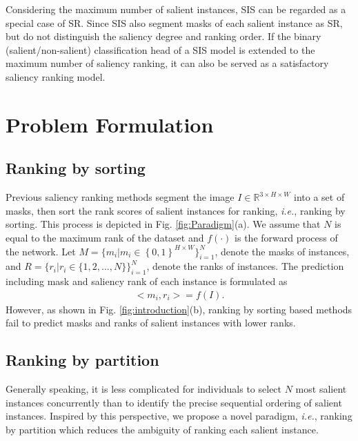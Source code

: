 \documentclass[sigconf]{acmart}
\def\ie{{\em i.e.}}
\begin{document}
Considering the maximum number of salient instances, SIS can be regarded as a special case of SR. Since SIS also segment masks of each salient instance as SR, but do not distinguish the saliency degree and ranking order. If the binary (salient/non-salient) classification head of a SIS model is extended to the maximum number of saliency ranking, it can also be served as a satisfactory saliency ranking model.

\section{Problem Formulation}
\subsection{Ranking by sorting} 
Previous saliency ranking methods \cite{siris2020inferring, liu2021instance, fang2021salient, tian2022bi} segment the image $I\in\mathbb{R}^{3\times H\times W}$ into a set of masks, then sort the rank scores of salient instances for ranking, \ie{}, ranking by sorting. This process is depicted in Fig. \ref{fig:Paradigm}(a). We assume that $N$ is equal to the maximum rank of the dataset and $f(\cdot)$ is the forward process of the network. Let $M = \{m_{i}|m_{i}\in\left\{0,1\right\}^{H\times W}\}_{i=1}^N$, denote the masks of instances, and $R = \{r_{i}|r_{i} \in \{1, 2, ..., N\}\}_{i=1}^N$, denote the ranks of instances. The prediction including mask and saliency rank of each instance is formulated as
 \begin{equation}
 \begin{split}
<m_i, r_\textit{i}> = f(I).
 \end{split}
 \end{equation}
However, as shown in Fig. \ref{fig:introduction}(b), ranking by sorting based methods \cite{siris2020inferring, liu2021instance, fang2021salient} fail to predict masks and ranks of salient instances with lower ranks.

\subsection{Ranking by partition} 
Generally speaking, it is less complicated for individuals to select $N$ most salient instances concurrently than to identify the precise sequential ordering of salient instances. Inspired by this perspective, we propose a novel paradigm, \ie{}, ranking by partition which reduces the ambiguity of ranking each salient instance. 
\end{document}
